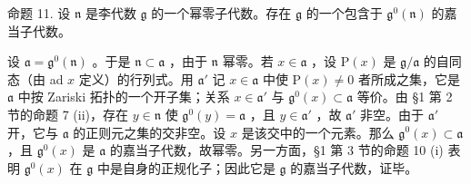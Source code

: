 命题 11. 设 \(\mathfrak{n}\) 是李代数 \(\mathfrak{g}\) 的一个幂零子代数。存在 \(\mathfrak{g}\) 的一个包含于 \(\mathfrak{g}^0 (\mathfrak{n})\) 的嘉当子代数。

设 \(\mathfrak{a} = \mathfrak{g}^0 (\mathfrak{n})\) 。于是 \(\mathfrak{n}\subset \mathfrak{a}\) ，由于 \(\mathfrak{n}\) 幂零。若 \(x\in \mathfrak{a}\) ，设 \(\mathrm{P}(x)\) 是 \(\mathfrak{g} / \mathfrak{a}\) 的自同态（由 ad \(x\) 定义）的行列式。用 \(\mathfrak{a}'\) 记 \(x\in \mathfrak{a}\) 中使 \(\mathrm{P}(x)\neq 0\) 者所成之集，它是 \(\mathfrak{a}\) 中按 Zariski 拓扑的一个开子集；关系 \(x\in \mathfrak{a}'\) 与 \(\mathfrak{g}^0 (x)\subset \mathfrak{a}\) 等价。由 §1 第 2 节的命题 7 (ii)，存在 \(y\in \mathfrak{n}\) 使 \(\mathfrak{g}^0 (y) = \mathfrak{a}\) ，且 \(y\in \mathfrak{a}'\) ，故 \(\mathfrak{a}'\) 非空。由于 \(\mathfrak{a}'\) 开，它与 \(\mathfrak{a}\) 的正则元之集的交非空。设 \(x\) 是该交中的一个元素。那么 \(\mathfrak{g}^0 (x)\subset \mathfrak{a}\) ，且 \(\mathfrak{g}^0 (x)\) 是 \(\mathfrak{a}\) 的嘉当子代数，故幂零。另一方面，§1 第 3 节的命题 10 (i) 表明 \(\mathfrak{g}^0 (x)\) 在 \(\mathfrak{g}\) 中是自身的正规化子；因此它是 \(\mathfrak{g}\) 的嘉当子代数，证毕。

